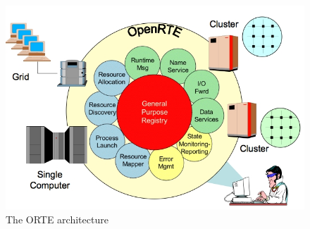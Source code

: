 \begin{figure}[h!]
\centering
\includegraphics[scale=0.5]{images/orte.png}
\caption[The ORTE architecture]{The ORTE architecture~\cite{hpcwire}}
\label{fig:orte-architecture}
\end{figure}

